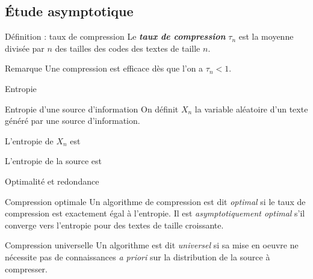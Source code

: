 \subsection{Étude asymptotique}

\begin{frame}

	\begin{block}{Définition : taux de compression}
		Le \emph{\bfseries taux de compression} $\tau_n$ est la moyenne divisée par $n$
		des tailles des codes des textes de taille $n$.
	\end{block}

	\begin{block}{Remarque}
		Une compression est efficace dès que l'on a $\tau_n < 1$.
	\end{block}

\end{frame}

\begin{frame}{Entropie}
	\begin{block}{Entropie d'une source d'information}
		On définit $X_n$ la variable aléatoire d'un 
		texte généré par une source d'information.

		L'entropie de $X_n$ est 

		L'entropie de la source est 
	\end{block}
\end{frame}

\begin{frame}{Optimalité et redondance}

	\begin{block}{Compression optimale}
		Un algorithme de compression est dit \emph{optimal} si le taux 
		de compression est exactement égal à l'entropie.
		Il est  
		\emph{asymptotiquement optimal} s'il converge vers l'entropie
		pour des textes de taille croissante.
	\end{block}

	\begin{block}{Compression universelle}
		Un algorithme est dit \emph{universel} si sa mise en oeuvre ne nécessite 
		pas de connaissances \textit{a priori} sur la distribution de la source 
		à compresser.
	\end{block}

\end{frame}


